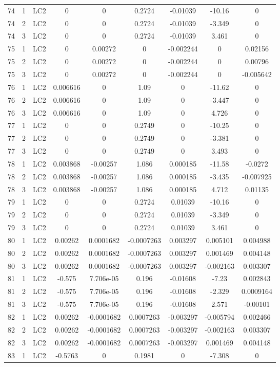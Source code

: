 \documentclass{article}%
\begin{document}
\begin{longtable}{| c c c | c c c c c c |}
74&1&LC2&0&0&0.2724&{-}0.01039&{-}10.16&0\\%
74&2&LC2&0&0&0.2724&{-}0.01039&{-}3.349&0\\%
74&3&LC2&0&0&0.2724&{-}0.01039&3.461&0\\%
75&1&LC2&0&0.00272&0&{-}0.002244&0&0.02156\\%
75&2&LC2&0&0.00272&0&{-}0.002244&0&0.00796\\%
75&3&LC2&0&0.00272&0&{-}0.002244&0&{-}0.005642\\%
76&1&LC2&0.006616&0&1.09&0&{-}11.62&0\\%
76&2&LC2&0.006616&0&1.09&0&{-}3.447&0\\%
76&3&LC2&0.006616&0&1.09&0&4.726&0\\%
77&1&LC2&0&0&0.2749&0&{-}10.25&0\\%
77&2&LC2&0&0&0.2749&0&{-}3.381&0\\%
77&3&LC2&0&0&0.2749&0&3.493&0\\%
78&1&LC2&0.003868&{-}0.00257&1.086&0.000185&{-}11.58&{-}0.0272\\%
78&2&LC2&0.003868&{-}0.00257&1.086&0.000185&{-}3.435&{-}0.007925\\%
78&3&LC2&0.003868&{-}0.00257&1.086&0.000185&4.712&0.01135\\%
79&1&LC2&0&0&0.2724&0.01039&{-}10.16&0\\%
79&2&LC2&0&0&0.2724&0.01039&{-}3.349&0\\%
79&3&LC2&0&0&0.2724&0.01039&3.461&0\\%
80&1&LC2&0.00262&0.0001682&{-}0.0007263&0.003297&0.005101&0.004988\\%
80&2&LC2&0.00262&0.0001682&{-}0.0007263&0.003297&0.001469&0.004148\\%
80&3&LC2&0.00262&0.0001682&{-}0.0007263&0.003297&{-}0.002163&0.003307\\%
81&1&LC2&{-}0.575&7.706e{-}05&0.196&{-}0.01608&{-}7.23&0.002843\\%
81&2&LC2&{-}0.575&7.706e{-}05&0.196&{-}0.01608&{-}2.329&0.0009164\\%
81&3&LC2&{-}0.575&7.706e{-}05&0.196&{-}0.01608&2.571&{-}0.00101\\%
82&1&LC2&0.00262&{-}0.0001682&0.0007263&{-}0.003297&{-}0.005794&0.002466\\%
82&2&LC2&0.00262&{-}0.0001682&0.0007263&{-}0.003297&{-}0.002163&0.003307\\%
82&3&LC2&0.00262&{-}0.0001682&0.0007263&{-}0.003297&0.001469&0.004148\\%
83&1&LC2&{-}0.5763&0&0.1981&0&{-}7.308&0\\%

\end{longtable}
\end{document}
